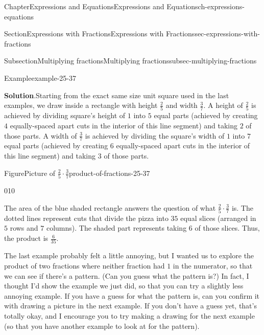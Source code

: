\documentclass[twoside,11pt,]{book}
\newcommand{\blocktitlefont}{\relax}
\numberwithin{equation}{chapter}
\begin{document}
\begin{chapterptx}{Chapter}{Expressions and Equations}{}{Expressions and Equations}{}{}{ch-expressions-equations}
\begin{sectionptx}{Section}{Expressions with Fractions}{}{Expressions with Fractions}{}{}{sec-expressions-with-fractions}
\begin{subsectionptx}{Subsection}{Multiplying fractions}{}{Multiplying fractions}{}{}{subsec-multiplying-fractions}
\begin{example}{Example}{}{example-25-37}
\par\smallskip%
\noindent\textbf{\blocktitlefont Solution}.\hypertarget{example-25-37-2}{}\quad{}Starting from the exact same size unit square used in the last examples, we draw inside a rectangle with height \(\frac25\) and width \(\frac37\). A height of \(\frac25\) is achieved by dividing square's height of \(1\) into \(5\) equal parts (achieved by creating \(4\) equally-spaced apart cuts in the interior of this line segment) and taking \(2\) of those parts. A width of \(\frac37\) is achieved by dividing the square's width of \(1\) into \(7\) equal parts (achieved by creating \(6\) equally-spaced apart cuts in the interior of this line segment) and taking \(3\) of those parts. \begin{figureptx}{Figure}{Picture of \(\frac25 \cdot \frac37\)}{product-of-fractions-25-37}{}%
\begin{image}{0}{1}{0}{}%
%
\end{image}%
\tcblower
\end{figureptx}%
 The area of the blue shaded rectangle answers the question of what \(\frac25 \cdot \frac37\) is. The dotted lines represent cuts that divide the pizza into \(35\) equal slices (arranged in \(5\) rows and \(7\) columns). The shaded part represents taking \(6\) of those slices. Thus, the product is \(\frac{6}{35}\).%
\end{example}
The last example probably felt a little annoying, but I wanted us to explore the product of two fractions where neither fraction had \(1\) in the numerator, so that we can see if there's a pattern. (Can you guess what the pattern is?) In fact, I thought I'd show the example we just did, so that you can try a slightly less annoying example. If you have a guess for what the pattern is, can you confirm it with drawing a picture in the next example. If you don't have a guess yet, that's totally okay, and I encourage you to try making a drawing for the next example (so that you have another example to look at for the pattern).%

\end{subsectionptx}
\end{sectionptx}
\end{chapterptx}
\end{document}
